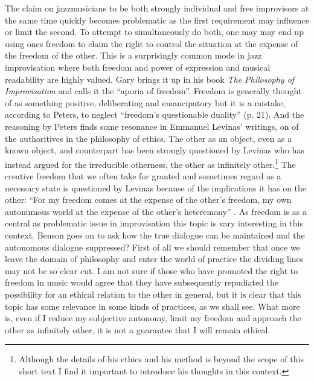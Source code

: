 \documentclass[a4paper]{article}
\begin{document}
The claim on jazzmusicians to be both strongly individual and free improvisors at the same time quickly becomes problematic as the first requirement may influence or limit the second. To attempt to simultaneously do both, one may may end up using ones freedom to claim the right to control the situation at the expense of the freedom of the other. This is a surprisingly common mode in jazz improvisation where both freedom and power of expression and musical readability are highly valued. Gary \citet{peters09} brings it up in his book \emph{The Philosophy of Improvisation} and calls it the ``aporia of freedom''. Freedom is generally thought of as something positive, deliberating and emancipatory but it is a mistake, according to Peters, to neglect ``freedom's questionable duality'' (p. 21). And the reasoning by Peters finds some resonance in Emmanuel Levinas' writings, on of the authoritives in the philosophy of ethics. The other as an object, even as a known object, and counterpart has been strongly questioned by Levinas who has instead argued for the irreducible otherness, the other as infinitely other.\footnote{Although the details of his ethics and his method is beyond the scope of this short text I find it important to introduce his thoughts in this context.} The creative freedom that we often take for granted and sometimes regard as a necessary state is questioned by Levinas because of the implications it has on the other: ``For my freedom comes at the expense of the other's freedom, my own autonumous world at the expense of the other's heteremony'' \citep[p. 165]{benson03}. As freedom is as a central as problematic issue in improvisation this topic is vary interesting in this context. Benson goes on to ask how the true dialogue can be maintained and the autonomous dialogue suppressed? First of all we should remember that once we leave the domain of philosophy and enter the world of practice the dividing lines may not be so clear cut. I am not sure if those who have promoted the right to freedom in music would agree that they have subsequently repudiated the possibility for an ethical relation to the other in general, but it is clear that this topic has some relevance in some kinds of practices, as we shall see. What more is, even if I reduce my subjective autonomy, limit my freedom and approach the other as infinitely other, it is not a guarantee that I will remain ethical.
\end{document}
